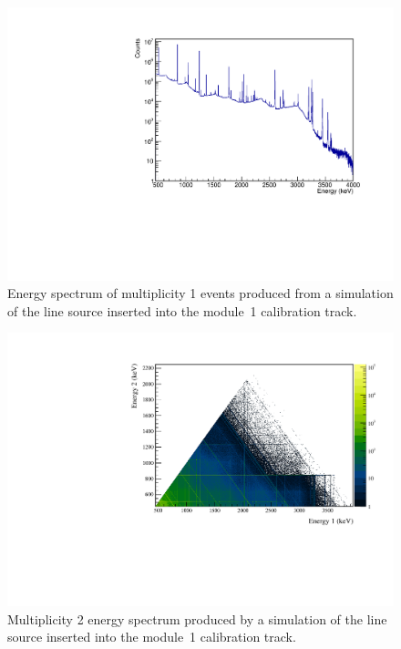 \documentclass[/main.tex]{subfiles}
\begin{document}
\begin{figure}
  \centering
  \includegraphics[width=.8\linewidth]{Co56Sim1D}
  \caption[Simulation of multiplicty 1 events from  line source]{ \label{fig:56Co1D}
    Energy spectrum of multiplicity 1 events produced from a simulation of the  line source inserted into the module~1 calibration track.
  }
\end{figure}

\begin{figure}
  \centering
  \includegraphics[width=.8\linewidth]{Co56Sim2D}
  \caption[Simulation of multiplicty 2 events from  line source]{ \label{fig:56Co1D}
    Multiplicity 2 energy spectrum produced by a simulation of the  line source inserted into the module~1 calibration track.
  }
\end{figure}


\onlyinsubfile{
  
  
}
\end{document}
